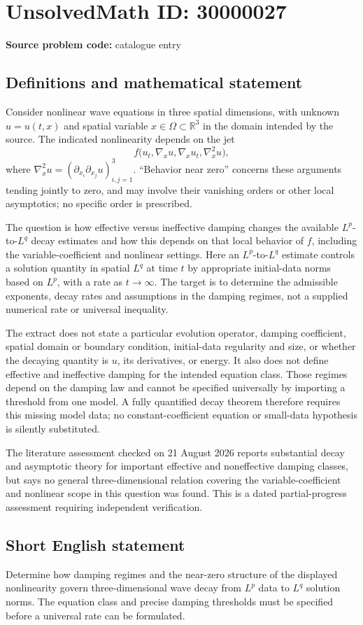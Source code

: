 \documentclass[11pt]{article}
\newcommand{\R}{\mathbb{R}}
\begin{document}
\section*{UnsolvedMath ID: 30000027}
\textbf{Source problem code:} catalogue entry
\subsection{Definitions and mathematical statement}
Consider nonlinear wave equations in three spatial dimensions, with unknown $u=u(t,x)$ and spatial variable $x\in\Omega\subset\R^3$ in the domain intended by the source. The indicated nonlinearity depends on the jet
\[
 f\bigl(u_t,\nabla_xu,\nabla_xu_t,\nabla_x^2u\bigr),
\]
where $\nabla_x^2u=(\partial_{x_i}\partial_{x_j}u)_{i,j=1}^3$. ``Behavior near zero'' concerns these arguments tending jointly to zero, and may involve their vanishing orders or other local asymptotics; no specific order is prescribed.

The question is how effective versus ineffective damping changes the available $L^p$-to-$L^q$ decay estimates and how this depends on that local behavior of $f$, including the variable-coefficient and nonlinear settings. Here an $L^p$-to-$L^q$ estimate controls a solution quantity in spatial $L^q$ at time $t$ by appropriate initial-data norms based on $L^p$, with a rate as $t\to\infty$. The target is to determine the admissible exponents, decay rates and assumptions in the damping regimes, not a supplied numerical rate or universal inequality.

The extract does not state a particular evolution operator, damping coefficient, spatial domain or boundary condition, initial-data regularity and size, or whether the decaying quantity is $u$, its derivatives, or energy. It also does not define effective and ineffective damping for the intended equation class. Those regimes depend on the damping law and cannot be specified universally by importing a threshold from one model. A fully quantified decay theorem therefore requires this missing model data; no constant-coefficient equation or small-data hypothesis is silently substituted.

The literature assessment checked on 21 August 2026 reports substantial decay and asymptotic theory for important effective and noneffective damping classes, but says no general three-dimensional relation covering the variable-coefficient and nonlinear scope in this question was found. This is a dated partial-progress assessment requiring independent verification.
\subsection{Short English statement}
Determine how damping regimes and the near-zero structure of the displayed nonlinearity govern three-dimensional wave decay from $L^p$ data to $L^q$ solution norms. The equation class and precise damping thresholds must be specified before a universal rate can be formulated.
\end{document}
